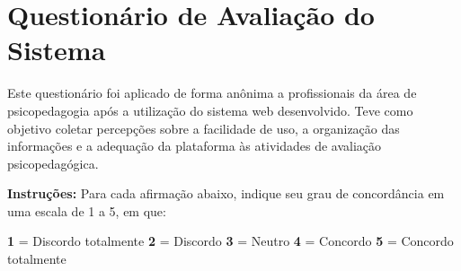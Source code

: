 \chapter{Questionário de Avaliação do Sistema}
\label{apendice:questionario}

Este questionário foi aplicado de forma anônima a profissionais da área de psicopedagogia após a utilização do sistema web desenvolvido. Teve como objetivo coletar percepções sobre a facilidade de uso, a organização das informações e a adequação da plataforma às atividades de avaliação psicopedagógica.

\bigskip
\textbf{Instruções:} Para cada afirmação abaixo, indique seu grau de concordância em uma escala de 1 a 5, em que:

\begin{center}
\textbf{1} = Discordo totalmente \quad \textbf{2} = Discordo \quad \textbf{3} = Neutro \quad \textbf{4} = Concordo \quad \textbf{5} = Concordo totalmente
\end{center}

\bigskip

